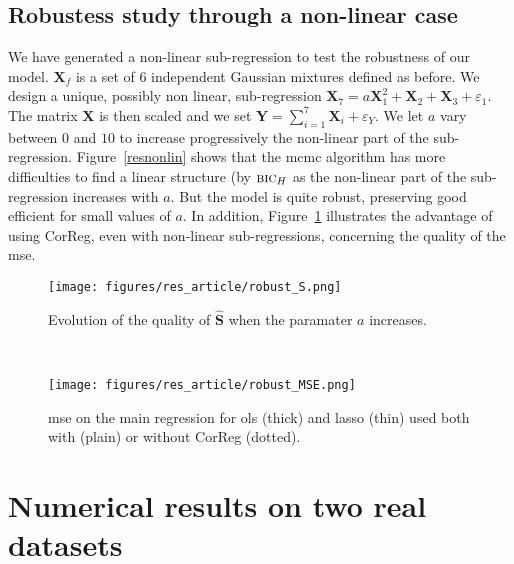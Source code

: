 \documentclass[11pt,a4paper]{article}
\begin{document}
\subsection{Robustess study through a non-linear case} \label{resrobust}


We have generated a non-linear sub-regression to test the robustness of our model. $\boldsymbol{X}_f$ is a set of 6 independent Gaussian mixtures defined as before. We design a unique, possibly non linear, sub-regression $\boldsymbol{X}_7=a\boldsymbol{X}_1^2+\boldsymbol{X}_2+\boldsymbol{X}_3+ \varepsilon_1$. The matrix $\boldsymbol{X}$ is then scaled and we set $\boldsymbol{Y}=\sum_{i=1}^7\boldsymbol{X}_i+\varepsilon_Y$. We let $a$ vary between $0$ and $10$ to increase progressively the non-linear part of the sub-regression.
Figure~\ref{resnonlin} shows that the {\sc mcmc} algorithm has more difficulties to find a linear structure (by  $\mbox{{\sc bic}}_H$ as the non-linear part of the sub-regression increases with $a$. But the model is quite robust, preserving good efficient for small values of $a$.
In addition, Figure~\ref{MSEnonlin} illustrates the advantage of using {\sc CorReg}, even with non-linear sub-regressions, concerning the quality of the {\sc mse}.

 \begin{figure}[h!] 
	\begin{minipage}[l]{.48\linewidth}
			\texttt{[image: figures/res\_article/robust\_S.png]} 
			\caption{Evolution of the quality of $\hat{\boldsymbol{S}}$ when the paramater $a$ increases.}\label{resnonlin}
	\end{minipage} \
   \begin{minipage}[r]{.48\linewidth}
			\texttt{[image: figures/res\_article/robust\_MSE.png]} 
			\caption{{\sc mse} on the main regression for {\sc ols} (thick) and {\sc lasso} (thin) used both with (plain) or without {\sc CorReg} (dotted).}\label{MSEnonlin}
   \end{minipage}
\end{figure}


	\FloatBarrier	
\section{Numerical results on two real datasets} \label{sectionrealcase}
\end{document}
